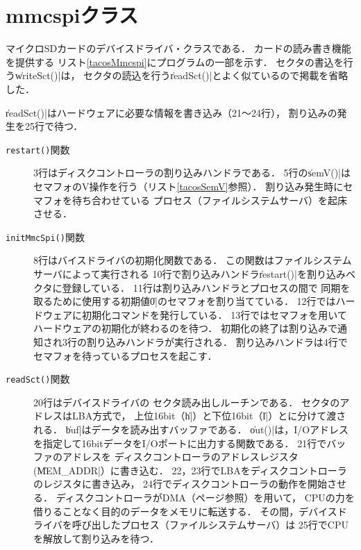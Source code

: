 \section{mmcspiクラス}
\label{tacosLbaDriver}
マイクロSDカードのデバイスドライバ・クラスである．
カードの読み書き機能を提供する
リスト\ref{tacosMmcspi}にプログラムの一部を示す．
セクタの書込を行う\|writeSct()|は，
セクタの読込を行う\|readSct()|とよく似ているので掲載を省略した．

  

\|readSct()|はハードウェアに必要な情報を書き込み（21〜24行），
割り込みの発生を25行で待つ．

\begin{description}
\item[\texttt{restart()}関数]
  3行はディスクコントローラの割り込みハンドラである．
  5行の\|semV()|はセマフォのV操作を行う（リスト\ref{tacosSemV}参照）．
  割り込み発生時にセマフォを待ち合わせている
  プロセス（ファイルシステムサーバ）を起床させる．
\item[\texttt{initMmcSpi()}関数]
  8行はバイスドライバの初期化関数である．
  この関数はファイルシステムサーバによって実行される
  10行で割り込みハンドラ\|restart()|を割り込みベクタに登録している．
  11行は割り込みハンドラとプロセスの間で
  同期を取るために使用する初期値\|0|のセマフォを割り当てている．
  12行ではハードウェアに初期化コマンドを発行している．
  13行ではセマフォを用いてハードウェアの初期化が終わるのを待つ．
  初期化の終了は割り込みで通知され3行の割り込みハンドラが実行される．
  割り込みハンドラは4行でセマフォを待っているプロセスを起こす．
\item[\texttt{readSct()}関数]
  20行はデバイスドライバの
  セクタ読み出しルーチンである．
  セクタのアドレスはLBA方式で，
  上位16bit（\|h|）と下位16bit（\|l|）とに分けて渡される．
  \|buf|はデータを読み出すバッファである．
  \|out()|は，I/Oアドレスを指定して16bitデータをI/Oポートに出力する関数である．
  21行でバッファのアドレスを
  ディスクコントローラのアドレスレジスタ(\|MEM_ADDR|）に書き込む．
  22，23行でLBAをディスクコントローラのレジスタに書き込み，
  24行でディスクコントローラの動作を開始させる．
  ディスクコントローラがDMA（\pageref{dma}ページ参照）を用いて，
  CPUの力を借りることなく目的のデータをメモリに転送する．
  その間，デバイスドライバを呼び出したプロセス（ファイルシステムサーバ）は
  25行でCPUを解放して割り込みを待つ．
\end{description}
